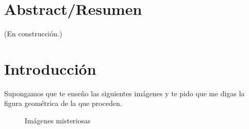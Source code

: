 \documentclass[12pt, a4paper, twoside]{book}
\numberwithin{equation}{section}
\theoremstyle{definition}
\theoremstyle{remark}
\theoremstyle{plain}
\begin{document}
	
	
	\pagestyle{main}

	
	
	\chapter*{Abstract/Resumen}
	(En construcción.)

	
	\tableofcontents

	
	\chapter{Introducción}
	Supongamos que te enseño las siguientes imágenes y te pido que me 
	digas la figura geométrica de la que proceden.

	\begin{figure}[H]
			\begin{figure}[H]
			\end{figure}
		\endminipage
			\begin{figure}[H]
			\end{figure}
		\endminipage
		\caption{Imágenes misteriosas}
	\end{figure}
\end{document}
